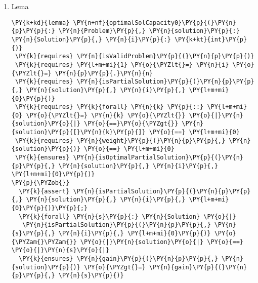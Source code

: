 \begin{sloppypar}
\begin{enumerate}
\begin{Verbatim}[commandchars=\\\{\}]
    \PY{n}{computeGainAllZeros}\PY{p}{(}\PY{n}{p}\PY{p}{,} \PY{n}{solution}\PY{p}{,} \PY{n}{i} \PY{o}{\PYZhy{}} \PY{l+m+mi}{1}\PY{p}{)}\PY{p}{;}
    \PY{k}{assert} \PY{n}{computeGain}\PY{p}{(}\PY{n}{p}\PY{p}{,} \PY{n}{solution}\PY{p}{,} \PY{n}{i} \PY{o}{\PYZhy{}} \PY{l+m+mi}{1}\PY{p}{)} \PY{o}{==} \PY{l+m+mi}{0}\PY{p}{;}
    \PY{k}{assert} \PY{n}{computeGain}\PY{p}{(}\PY{n}{p}\PY{p}{,} \PY{n}{solution}\PY{p}{,} \PY{n}{i}\PY{p}{)} \PY{o}{==} \PY{l+m+mi}{0}\PY{p}{;}
  \PY{p}{\PYZcb{}}
\PY{p}{\PYZcb{}}
\end{Verbatim}
    \hspace{2mm} Această lemă este demonstrată prin inducție și folosită pentru a arăta că dacă avem o soluție ce conține doar elemente de 0, atunci câștigul produs de o astfel de soluție nu poate fi decât 0. 
    \item Lema 
    \begin{Verbatim}[commandchars=\\\{\}]
\PY{k+kd}{lemma} \PY{n+nf}{optimalSolCapacity0}\PY{p}{(}\PY{n}{p}\PY{p}{:} \PY{n}{Problem}\PY{p}{,} \PY{n}{solution}\PY{p}{:} \PY{n}{Solution}\PY{p}{,} \PY{n}{i}\PY{p}{:} \PY{k+kt}{int}\PY{p}{)}
 \PY{k}{requires} \PY{n}{isValidProblem}\PY{p}{(}\PY{n}{p}\PY{p}{)}
 \PY{k}{requires} \PY{l+m+mi}{1} \PY{o}{\PYZlt{}=} \PY{n}{i} \PY{o}{\PYZlt{}=} \PY{n}{p}\PY{p}{.}\PY{n}{n}
 \PY{k}{requires} \PY{n}{isPartialSolution}\PY{p}{(}\PY{n}{p}\PY{p}{,} \PY{n}{solution}\PY{p}{,} \PY{n}{i}\PY{p}{,} \PY{l+m+mi}{0}\PY{p}{)}
 \PY{k}{requires} \PY{k}{forall} \PY{n}{k} \PY{p}{::} \PY{l+m+mi}{0} \PY{o}{\PYZlt{}=} \PY{n}{k} \PY{o}{\PYZlt{}} \PY{o}{|}\PY{n}{solution}\PY{o}{|} \PY{o}{==}\PY{o}{\PYZgt{}} \PY{n}{solution}\PY{p}{[}\PY{n}{k}\PY{p}{]} \PY{o}{==} \PY{l+m+mi}{0}
 \PY{k}{requires} \PY{n}{weight}\PY{p}{(}\PY{n}{p}\PY{p}{,} \PY{n}{solution}\PY{p}{)} \PY{o}{==} \PY{l+m+mi}{0}
 \PY{k}{ensures} \PY{n}{isOptimalPartialSolution}\PY{p}{(}\PY{n}{p}\PY{p}{,} \PY{n}{solution}\PY{p}{,} \PY{n}{i}\PY{p}{,} \PY{l+m+mi}{0}\PY{p}{)}
\PY{p}{\PYZob{}}
  \PY{k}{assert} \PY{n}{isPartialSolution}\PY{p}{(}\PY{n}{p}\PY{p}{,} \PY{n}{solution}\PY{p}{,} \PY{n}{i}\PY{p}{,} \PY{l+m+mi}{0}\PY{p}{)}\PY{p}{;}
  \PY{k}{forall} \PY{n}{s}\PY{p}{:} \PY{n}{Solution} \PY{o}{|} 
   \PY{n}{isPartialSolution}\PY{p}{(}\PY{n}{p}\PY{p}{,} \PY{n}{s}\PY{p}{,} \PY{n}{i}\PY{p}{,} \PY{l+m+mi}{0}\PY{p}{)} \PY{o}{\PYZam{}\PYZam{}} \PY{o}{|}\PY{n}{solution}\PY{o}{|} \PY{o}{==} \PY{o}{|}\PY{n}{s}\PY{o}{|}
  \PY{k}{ensures} \PY{n}{gain}\PY{p}{(}\PY{n}{p}\PY{p}{,} \PY{n}{solution}\PY{p}{)} \PY{o}{\PYZgt{}=} \PY{n}{gain}\PY{p}{(}\PY{n}{p}\PY{p}{,} \PY{n}{s}\PY{p}{)}

\end{Verbatim}
\end{enumerate}
\end{sloppypar}
